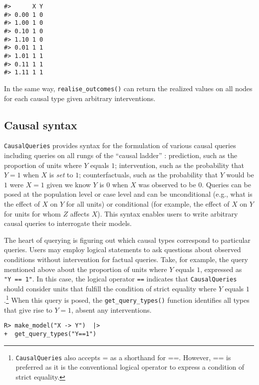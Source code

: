 \documentclass[
  11pt,
  article]{jss}
\begin{document}
\begin{verbatim}
#>      X Y
#> 0.00 1 0
#> 1.00 1 0
#> 0.10 1 0
#> 1.10 1 0
#> 0.01 1 1
#> 1.01 1 1
#> 0.11 1 1
#> 1.11 1 1
\end{verbatim}

In the same way, \texttt{realise\_outcomes()} can return the realized
values on all nodes for each causal type given arbitrary interventions.

\subsection{Causal syntax}\label{sec-syntax}

\texttt{CausalQueries} provides syntax for the formulation of various
causal queries including queries on all rungs of the ``causal ladder''
\citep{pearl_causality_2009}: prediction, such as the proportion of
units where \(Y\) equals \(1\); intervention, such as the probability
that \(Y = 1\) when \(X\) is \emph{set} to \(1\); counterfactuals, such
as the probability that \(Y\) would be \(1\) were \(X = 1\) given we
know \(Y\) is \(0\) when \(X\) was observed to be \(0\). Queries can be
posed at the population level or case level and can be unconditional
(e.g., what is the effect of \(X\) on \(Y\) for all units) or
conditional (for example, the effect of \(X\) on \(Y\) for units for
whom \(Z\) affects \(X\)). This syntax enables users to write arbitrary
causal queries to interrogate their models.

The heart of querying is figuring out which causal types correspond to
particular queries. Users may employ logical statements to ask questions
about observed conditions without intervention for factual queries.
Take, for example, the query mentioned above about the proportion of
units where \(Y\) equals \(1\), expressed as \texttt{"Y\ ==\ 1"}. In
this case, the logical operator \texttt{==} indicates that
\texttt{CausalQueries} should consider units that fulfill the condition
of strict equality where \(Y\) equals \(1\).\footnote{\texttt{CausalQueries}
  also accepts = as a shorthand for ==. However, == is preferred as it
  is the conventional logical operator to express a condition of strict
  equality.} When this query is posed, the \texttt{get\_query\_types()}
function identifies all types that give rise to \(Y=1\), absent any
interventions.

\begin{verbatim}
R> make_model("X -> Y")  |> 
+  get_query_types("Y==1")
\end{verbatim}
\end{document}
